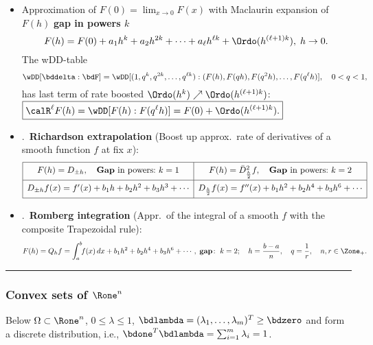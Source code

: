 \documentclass[a4paper]{article}
\begin{document}
\begin{itemize}
\item
Approximation of $F(0)=\lim_{x\to0}F(x)$
with Maclaurin expansion of $F(h)$
\textbf{gap in powers $k$}
\[
  F(h) = F(0) + a_1h^k+a_2h^{2k}+\cdots+a_\ell h^{\ell k} + \Ordo(h^{(\ell+1)k}),\; h\to 0.
\]
The  wDD-table
\[
  \wDD[\bddelta:\bdF]
  =\wDD[(1,q^k,q^{2k},\ldots,q^{\ell k}):(F(h),F(qh),F(q^2h),\ldots,F(q^\ell h)], \quad 0<q<1,
\]
 has last term of rate boosted $\Ordo(h^k)\nearrow\Ordo(h^{(\ell+1)k})$:
 \/
\(
  \boxed{\calR^\ell F(h)=\wDD[F(h):F(q^\ell h)]=F(0) + \Ordo(h^{(\ell+1)k}).}
\)

\item \Ex.~\textbf{Richardson extrapolation}
  (Boost up approx.~rate of derivatives of a smooth function $f$ at fix $x$):
  \[
  \begin{array}{|c|c|}
    \hline \rule[0pt]{0pt}{12pt}
    F(h) = D_{\pm h}, \quad \text{\textbf{Gap} in powers:}~k=1
      & F(h) = \bar D^2_{\frac h2}f, \quad \text{\textbf{Gap} in powers:}~k=2
      \\[5pt]
    \hline \rule[0pt]{0pt}{12pt}
        D_{\pm h}f(x) = f'(x)+b_1h +b_2h^2+b_3h^3+\cdots
      & D_{\frac h2}f(x) = f''(x)+b_1h^2 +b_2h^4+b_3h^6+\cdots
      \\[5pt]
    \hline
  \end{array}
  \]
  \item \Ex.~\textbf{Romberg integration}
    (Appr.~of the integral of a smooth $f$ with the composite Trapezoidal rule):
    \[
      F(h)=Q_hf
      = \int_a^b \!\! f(x)\,dx +b_1h^2 +b_2h^4+b_3h^6+\cdots,
      \;\textbf{gap}\!:~k=2;\quad
      h=\frac{b-a}{n},\quad
      q=\frac1r,\quad
      n,r\in\Zone_+.
    \]
\end{itemize}


\medskip\hrule


\subsubsection*{Convex sets of $\Rone^n$}%

Below
$\Omega\subset\Rone^n$,
$0\le \lambda\le 1$,
$\bdlambda=(\lambda_1,\ldots,\lambda_m)^T\ge\bdzero$
and form a discrete distribution, i.e.,
$\bdone^T\bdlambda=\sum_{i=1}^m \lambda_i=1$.
\end{document}
